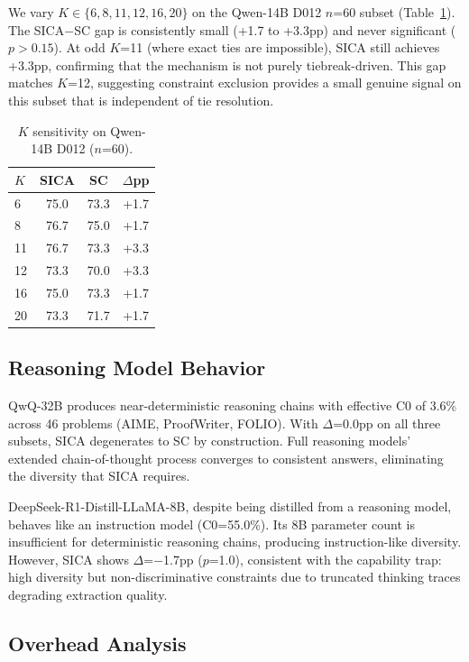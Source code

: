 \documentclass[11pt,a4paper]{article}
\begin{document}
We vary $K \in \{6, 8, 11, 12, 16, 20\}$ on the Qwen-14B D012 $n$=60 subset (Table~\ref{tab:kablation}). The SICA$-$SC gap is consistently small (+1.7 to +3.3pp) and never significant ($p > 0.15$). At odd $K$=11 (where exact ties are impossible), SICA still achieves +3.3pp, confirming that the mechanism is not purely tiebreak-driven. This gap matches $K$=12, suggesting constraint exclusion provides a small genuine signal on this subset that is independent of tie resolution.

\begin{table}[t]
\centering
\caption{$K$ sensitivity on Qwen-14B D012 ($n$=60).}
\label{tab:kablation}
\small
\begin{tabular}{lccc}
\toprule
\textbf{$K$} & \textbf{SICA} & \textbf{SC} & \textbf{$\Delta$pp} \\
\midrule
6 & 75.0 & 73.3 & +1.7 \\
8 & 76.7 & 75.0 & +1.7 \\
11 & 76.7 & 73.3 & +3.3 \\
12 & 73.3 & 70.0 & +3.3 \\
16 & 75.0 & 73.3 & +1.7 \\
20 & 73.3 & 71.7 & +1.7 \\
\bottomrule
\end{tabular}
\end{table}

\subsection{Reasoning Model Behavior}

QwQ-32B produces near-deterministic reasoning chains with effective C0 of 3.6\% across 46 problems (AIME, ProofWriter, FOLIO). With $\Delta$=0.0pp on all three subsets, SICA degenerates to SC by construction. Full reasoning models' extended chain-of-thought process converges to consistent answers, eliminating the diversity that SICA requires.

DeepSeek-R1-Distill-LLaMA-8B, despite being distilled from a reasoning model, behaves like an instruction model (C0=55.0\%). Its 8B parameter count is insufficient for deterministic reasoning chains, producing instruction-like diversity. However, SICA shows $\Delta$=$-$1.7pp ($p$=1.0), consistent with the capability trap: high diversity but non-discriminative constraints due to truncated thinking traces degrading extraction quality.

\subsection{Overhead Analysis}
\label{sec:overhead}
\end{document}
